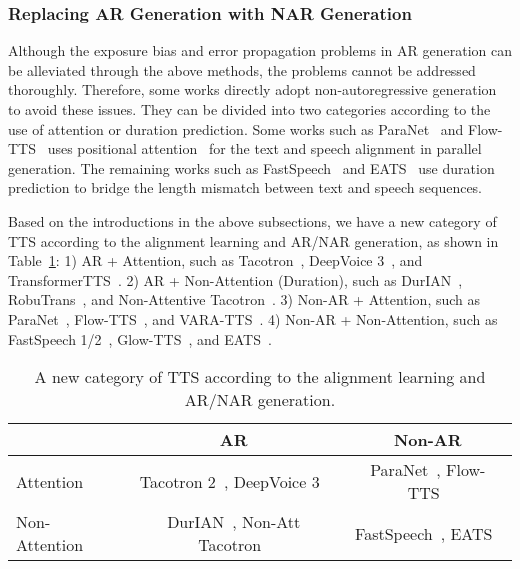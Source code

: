 \documentclass{article}
\begin{document}
\subsubsection{Replacing AR Generation with NAR Generation}
Although the exposure bias and error propagation problems in AR generation can be alleviated through the above methods, the problems cannot be addressed thoroughly. Therefore, some works directly adopt non-autoregressive generation to avoid these issues. They can be divided into two categories according to the use of attention or duration prediction. Some works such as ParaNet~\cite{peng2020non} and Flow-TTS~\cite{miao2020flow} uses positional attention~\cite{ping2018deep} for the text and speech alignment in parallel generation. The remaining works such as FastSpeech~\cite{ren2019fastspeech,ren2021fastspeech} and EATS~\cite{donahue2020end} use duration prediction to bridge the length mismatch between text and speech sequences. 

Based on the introductions in the above subsections, we have a new category of TTS according to the alignment learning and AR/NAR generation, as shown in Table~\ref{tab_robustness_taxonomy}: 1) AR + Attention, such as Tacotron~\cite{wang2017tacotron,shen2018natural}, DeepVoice 3~\cite{ping2018deep}, and TransformerTTS~\cite{li2019neural}. 2) AR + Non-Attention (Duration), such as DurIAN~\cite{yu2020durian}, RobuTrans~\cite{li2020robutrans}, and Non-Attentive Tacotron~\cite{shen2020non}. 3) Non-AR + Attention, such as ParaNet~\cite{peng2020non}, Flow-TTS~\cite{miao2020flow}, and VARA-TTS~\cite{liu2021vara}. 4) Non-AR + Non-Attention, such as FastSpeech 1/2~\cite{ren2019fastspeech,ren2021fastspeech}, Glow-TTS~\cite{kim2020glow}, and EATS~\cite{donahue2020end}.


\begin{table}[h]
\small
	\caption{A new category of TTS according to the alignment learning and AR/NAR generation.}
	\centering
	\begin{tabular}{l | c | c }
		\toprule
		\diagbox{Attention?}{AR?} & AR & Non-AR  \\
		\midrule
		 Attention & Tacotron 2~\cite{shen2018natural}, DeepVoice 3~\cite{ping2018deep} & ParaNet~\cite{peng2020non}, Flow-TTS~\cite{miao2020flow} \\
		\midrule
		Non-Attention & DurIAN~\cite{yu2020durian}, Non-Att Tacotron~\cite{shen2020non} & FastSpeech~\cite{ren2019fastspeech,ren2021fastspeech}, EATS~\cite{donahue2020end} \\
		\bottomrule
	\end{tabular}
	\label{tab_robustness_taxonomy}
\end{table}
\end{document}
